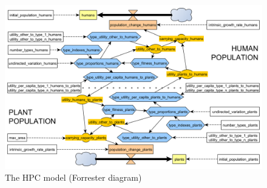 \documentclass[
]{book}
\begin{document}
\begin{figure}

{\centering \includegraphics[width=1\linewidth]{images/Forrester-diagram} 

}

\caption{The HPC model (Forrester diagram)}\label{fig:forrester-diagram}
\end{figure}
\end{document}
